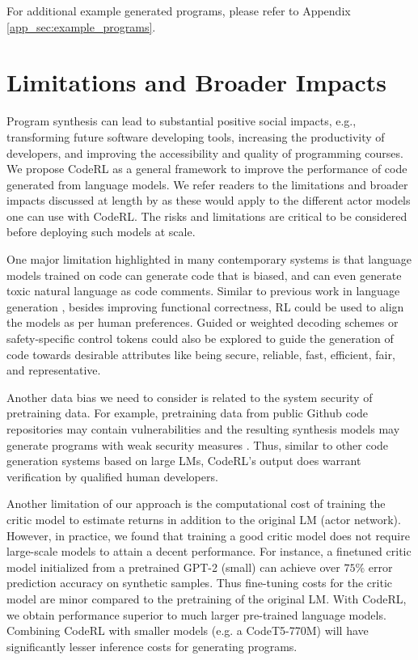 \documentclass{article}
\begin{document}
For additional example generated programs, please refer to Appendix \ref{app_sec:example_programs}. 

 
\section{Limitations and Broader Impacts}\label{sec:limitation}
Program synthesis can lead to substantial positive social impacts, e.g., transforming future software developing tools, increasing the productivity of developers, and improving the accessibility and quality of programming courses. We propose CodeRL as a general framework to improve the performance of code generated from language models. We refer readers to the limitations and broader impacts discussed at length by \cite{chen2021evaluating} as these would apply to the different actor models one can use with CodeRL. The risks and limitations are critical to be considered before deploying such models at scale. 

One major limitation highlighted in many contemporary systems is that language models trained on code can generate code that is biased, and can even generate toxic natural language as code comments. Similar to previous work in language generation \citep{ouyang2022training}, besides improving functional correctness, RL could be used to align the models as per human preferences. Guided or weighted decoding schemes \citep{krause2020gedi} or safety-specific control tokens \citep{xu2020recipes} could also be explored to guide the generation of code towards desirable attributes like being secure, reliable, fast, efficient, fair, and representative.


Another data bias we need to consider is related to the system security of pretraining data. 
For example, pretraining data from public Github code repositories may contain vulnerabilities and the resulting synthesis models may generate programs with weak security measures \citep{hammond2021empirical}. Thus, similar to other code generation systems based on large LMs, CodeRL's output does warrant verification by qualified human developers.



Another limitation of our approach is the computational cost of training the critic model to estimate returns in addition to the original LM (actor network). However, in practice, we found that training a good critic model does not require large-scale models to attain a decent performance. For instance, a finetuned critic model initialized from a pretrained GPT-2 (small) can achieve over $75\%$ error prediction accuracy on synthetic samples. Thus fine-tuning costs for the critic model are minor compared to the pretraining of the original LM. With CodeRL, we obtain performance superior to much larger pre-trained language models.
Combining CodeRL with smaller models (e.g. a CodeT5-770M) will have significantly lesser inference costs for generating programs.  
\end{document}
